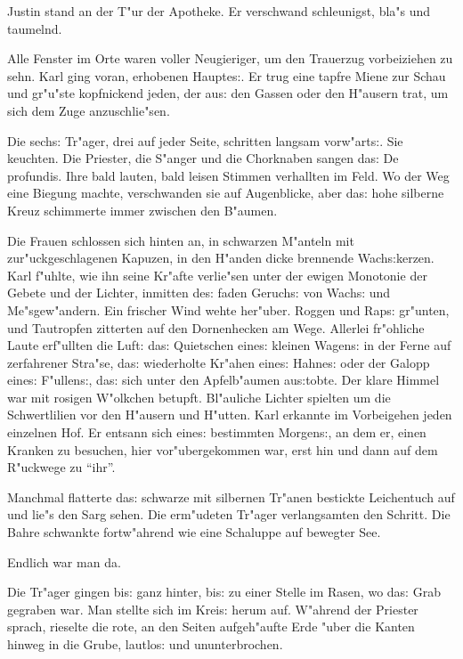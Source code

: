 \documentclass[oneside,12pt]{book}
\newenvironment{antiqua}{\normalfont}{}%
\newcommand{\s}{s:}%
\begin{document}
Justin stand an der T"ur der Apotheke. Er verschwand schleunigst,
bla"s und taumelnd.

Alle Fenster im Orte waren voller Neugieriger, um den Trauerzug
vorbeiziehen zu sehn. Karl ging voran, erhobenen Haupte{\s}. Er
trug eine tapfre Miene zur Schau und gr"u"ste kopfnickend jeden,
der au{\s} den Gassen oder den H"ausern trat, um sich dem Zuge
anzuschlie"sen.

Die sech{\s} Tr"ager, drei auf jeder Seite, schritten langsam
vorw"art{\s}. Sie keuchten. Die Priester, die S"anger und die
Chorknaben sangen da{\s} \begin{antiqua}De profundis\end{antiqua}.
Ihre bald lauten, bald leisen Stimmen verhallten im Feld. Wo der
Weg eine Biegung machte, verschwanden sie auf Augenblicke, aber
da{\s} hohe silberne Kreuz schimmerte immer zwischen den B"aumen.

Die Frauen schlossen sich hinten an, in schwarzen M"anteln mit
zur"uckgeschlagenen Kapuzen, in den H"anden dicke brennende
Wach{\s}kerzen. Karl f"uhlte, wie ihn seine Kr"afte verlie"sen
unter der ewigen Monotonie der Gebete und der Lichter, inmitten
de{\s} faden Geruch{\s} von Wach{\s} und Me"sgew"andern. Ein
frischer Wind wehte her"uber. Roggen und Rap{\s} gr"unten, und
Tautropfen zitterten auf den Dornenhecken am Wege. Allerlei
fr"ohliche Laute erf"ullten die Luft: da{\s} Quietschen eine{\s}
kleinen Wagen{\s} in der Ferne auf zerfahrener Stra"se, da{\s}
wiederholte Kr"ahen eine{\s} Hahne{\s} oder der Galopp eine{\s}
F"ullen{\s}, da{\s} sich unter den Apfelb"aumen au{\s}tobte. Der
klare Himmel war mit rosigen W"olkchen betupft. Bl"auliche Lichter
spielten um die Schwertlilien vor den H"ausern und H"utten. Karl
erkannte im Vorbeigehen jeden einzelnen Hof. Er entsann sich
eine{\s} bestimmten Morgen{\s}, an dem er, einen Kranken zu
besuchen, hier vor"ubergekommen war, erst hin und dann auf dem
R"uckwege zu "`ihr"'.

Manchmal flatterte da{\s} schwarze mit silbernen Tr"anen bestickte
Leichentuch auf und lie"s den Sarg sehen. Die erm"udeten Tr"ager
verlangsamten den Schritt. Die Bahre schwankte fortw"ahrend wie
eine Schaluppe auf bewegter See.

Endlich war man da.

Die Tr"ager gingen bi{\s} ganz hinter, bi{\s} zu einer Stelle im
Rasen, wo da{\s} Grab gegraben war. Man stellte sich im Krei{\s}
herum auf. W"ahrend der Priester sprach, rieselte die rote, an den
Seiten aufgeh"aufte Erde "uber die Kanten hinweg in die Grube,
lautlo{\s} und ununterbrochen.
\end{document}
